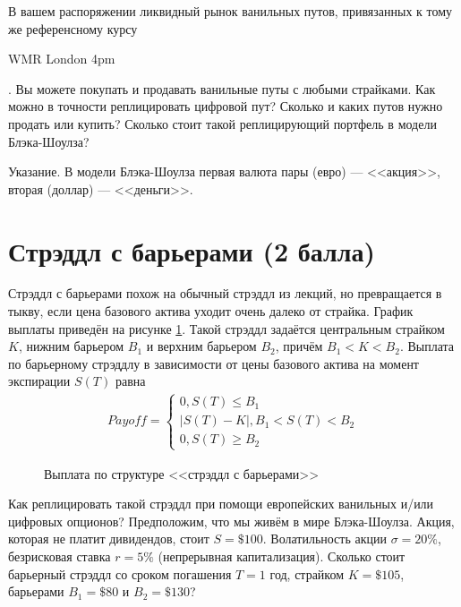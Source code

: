 \documentclass[a4paper,14pt]{extarticle}
\newcommand{\en}[1]{\begin{otherlanguage}{english}#1\end{otherlanguage}}
\begin{document}
В вашем распоряжении ликвидный рынок ванильных путов, привязанных к тому же референсному курсу \en{WMR London 4pm}. Вы можете покупать и продавать ванильные путы с любыми страйками. Как можно в точности реплицировать цифровой пут? Сколько и каких путов нужно продать или купить? Сколько стоит такой реплицирующий портфель в модели Блэка-Шоулза? 

Указание. В модели Блэка-Шоулза первая валюта пары (евро) --- <<акция>>, вторая (доллар) --- <<деньги>>.

\section{Стрэддл с барьерами (2 балла)}

Стрэддл с барьерами похож на обычный стрэддл из лекций, но превращается в тыкву, если цена базового актива уходит очень далеко от страйка. График выплаты приведён на рисунке \ref{staddle_payoff}. Такой стрэддл задаётся центральным страйком $K$, нижним барьером $B_1$ и верхним барьером $B_2$, причём $B_1 < K < B_2$. Выплата по барьерному стрэддлу в зависимости от цены базового актива на момент экспирации $S(T)$ равна
\begin{align*}
Payoff = \begin{cases}
0, S(T) \le B_1\\
|S(T) - K|, B_1 < S(T) < B_2 \\
0, S(T) \ge B_2
\end{cases}
\end{align*}

\begin{figure}[h]
\centering
{}
\caption{Выплата по структуре <<стрэддл с барьерами>>}
\label{staddle_payoff}
\end{figure}

Как реплицировать такой стрэддл  при помощи европейских ванильных и/или цифровых опционов? Предположим, что мы 
живём в мире Блэка-Шоулза. Акция, которая не платит дивидендов, стоит $S=\$100$. Волатильность акции $\sigma=20\%$, безрисковая ставка $r=5\%$ (непрерывная капитализация). Сколько стоит барьерный стрэддл со сроком погашения $T=1$ год, страйком $K=\$105$, барьерами $B_1=\$80$ и $B_2=\$130$?
\end{document}
